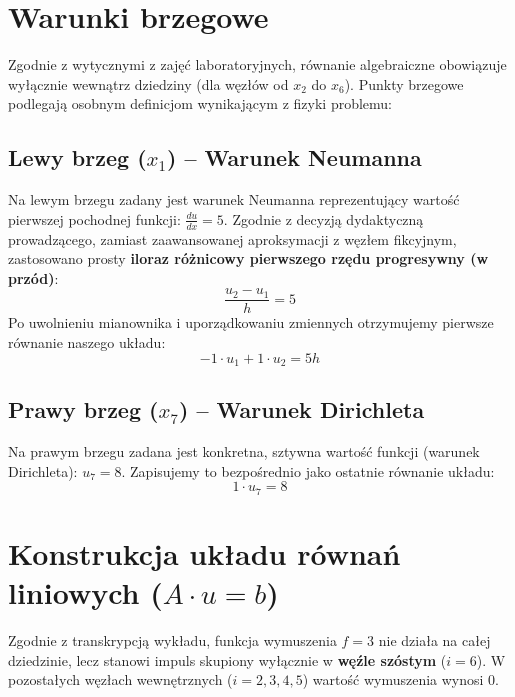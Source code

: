 \documentclass[a4paper,14pt]{scrartcl}
\begin{document}
\section{Warunki brzegowe}
Zgodnie z wytycznymi z zajęć laboratoryjnych, równanie algebraiczne obowiązuje wyłącznie wewnątrz dziedziny (dla węzłów od $x_2$ do $x_6$). Punkty brzegowe podlegają osobnym definicjom wynikającym z fizyki problemu:

\subsection{Lewy brzeg ($x_1$) -- Warunek Neumanna}
Na lewym brzegu zadany jest warunek Neumanna reprezentujący wartość pierwszej pochodnej funkcji: $\frac{du}{dx} = 5$. Zgodnie z decyzją dydaktyczną prowadzącego, zamiast zaawansowanej aproksymacji z węzłem fikcyjnym, zastosowano prosty \textbf{iloraz różnicowy pierwszego rzędu progresywny (w przód)}:
\begin{equation}
    \frac{u_2 - u_1}{h} = 5
\end{equation}
Po uwolnieniu mianownika i uporządkowaniu zmiennych otrzymujemy pierwsze równanie naszego układu:
\begin{equation}
    -1 \cdot u_1 + 1 \cdot u_2 = 5h
\end{equation}

\subsection{Prawy brzeg ($x_7$) -- Warunek Dirichleta}
Na prawym brzegu zadana jest konkretna, sztywna wartość funkcji (warunek Dirichleta): $u_7 = 8$. Zapisujemy to bezpośrednio jako ostatnie równanie układu:
\begin{equation}
    1 \cdot u_7 = 8
\end{equation}

\section{Konstrukcja układu równań liniowych ($A \cdot u = b$)}
Zgodnie z transkrypcją wykładu, funkcja wymuszenia $f = 3$ nie działa na całej dziedzinie, lecz stanowi impuls skupiony wyłącznie w \textbf{węźle szóstym} ($i=6$). W pozostałych węzłach wewnętrznych ($i=2,3,4,5$) wartość wymuszenia wynosi $0$.
\end{document}

